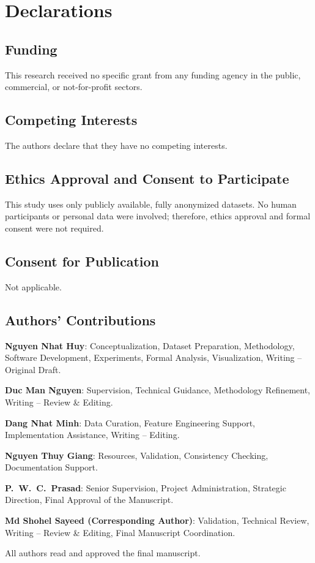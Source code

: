 \documentclass[11pt,a4paper]{article}
\begin{document}
\section*{Declarations}

\subsection*{Funding}
This research received no specific grant from any funding agency in the public, 
commercial, or not-for-profit sectors.

\subsection*{Competing Interests}
The authors declare that they have no competing interests.

\subsection*{Ethics Approval and Consent to Participate}
This study uses only publicly available, fully anonymized datasets. 
No human participants or personal data were involved; therefore, 
ethics approval and formal consent were not required.

\subsection*{Consent for Publication}
Not applicable.

\subsection*{Authors' Contributions}

\textbf{Nguyen Nhat Huy}: Conceptualization, Dataset Preparation, Methodology, Software Development, 
Experiments, Formal Analysis, Visualization, Writing – Original Draft.

\textbf{Duc Man Nguyen}: Supervision, Technical Guidance, Methodology Refinement,
Writing – Review \& Editing.

\textbf{Dang Nhat Minh}: Data Curation, Feature Engineering Support, Implementation Assistance,
Writing – Editing.

\textbf{Nguyen Thuy Giang}: Resources, Validation, Consistency Checking, Documentation Support.

\textbf{P.~W.~C.~Prasad}: Senior Supervision, Project Administration, Strategic Direction,
Final Approval of the Manuscript.

\textbf{Md Shohel Sayeed (Corresponding Author)}: Validation, Technical Review, Writing – Review \& Editing, 
Final Manuscript Coordination.

All authors read and approved the final manuscript.











\end{document}
